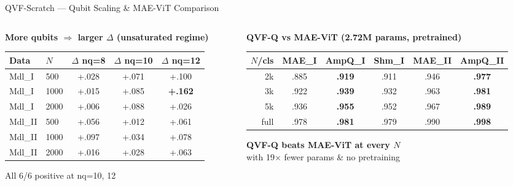 \documentclass[aspectratio=169]{beamer}
\newcommand{\win}[1]{\textcolor{good}{\textbf{#1}}}
\newcommand{\qs}[1]{\textcolor{q}{\textbf{#1}}}
\begin{document}
\begin{frame}{QVF-Scratch — Qubit Scaling \& MAE-ViT Comparison}
\begin{columns}
\begin{column}{0.48\textwidth}
\textbf{More qubits $\Rightarrow$ larger $\Delta$ (unsaturated regime)}
\smallskip

\scriptsize
\begin{tabular}{@{}llccc@{}}
\toprule
Data & $N$ & $\Delta$ nq=8 & $\Delta$ nq=10 & $\Delta$ nq=12 \\
\midrule
Mdl\_I  & 500  & +.028 & +.071 & +.100 \\
Mdl\_I  & 1000 & +.015 & +.085 & \win{+.162} \\
Mdl\_I  & 2000 & +.006 & +.088 & +.026 \\
Mdl\_II & 500  & +.056 & +.012 & +.061 \\
Mdl\_II & 1000 & +.097 & +.034 & +.078 \\
Mdl\_II & 2000 & +.016 & +.028 & +.063 \\
\bottomrule
\end{tabular}

\smallskip
All 6/6 positive at nq=10, 12
\end{column}
\begin{column}{0.5\textwidth}
\textbf{QVF-Q vs MAE-ViT (2.72M params, pretrained)}
\smallskip

\scriptsize
\begin{tabular}{@{}rccccc@{}}
\toprule
$N$/cls & MAE\_I & \qs{AmpQ\_I} & Shm\_I & MAE\_II & \qs{AmpQ\_II} \\
\midrule
2k & .885 & \win{.919} & .911 & .946 & \win{.977} \\
3k & .922 & \win{.939} & .932 & .963 & \win{.981} \\
5k & .936 & \win{.955} & .952 & .967 & \win{.989} \\
full & .978 & \win{.981} & .979 & .990 & \win{.998} \\
\bottomrule
\end{tabular}

\medskip
\normalsize
\textbf{QVF-Q beats MAE-ViT at every $N$}\\
\small with 19$\times$ fewer params \& no pretraining
\end{column}
\end{columns}
\end{frame}
\end{document}
